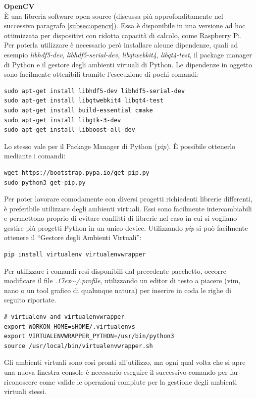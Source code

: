 \documentclass[12pt]{article}
\newcommand{\quotes}[1]{``#1''}
\begin{document}
\vspace{0.5cm}
\textbf{OpenCV}\\
È una libreria software open source (discussa più approfonditamente nel successivo paragrafo \ref{subsec:opencv}).
Essa è disponibile in una versione ad hoc ottimizzata per dispositivi con ridotta capacità di calcolo, come Raspberry Pi. Per poterla utilizzare è necessario però installare alcune dipendenze, quali ad esempio \textit{libhdf5-dev}, \textit{libhdf5-serial-dev}, \textit{libqtwebkit4}, \textit{libqt4-test}, il package manager di Python e il gestore degli ambienti virtuali di Python. Le dipendenze in oggetto sono facilmente ottenibili tramite l'esecuzione di pochi comandi:
\begin{lstlisting}
sudo apt-get install libhdf5-dev libhdf5-serial-dev
sudo apt-get install libqtwebkit4 libqt4-test
sudo apt-get install build-essential cmake
sudo apt-get install libgtk-3-dev
sudo apt-get install libboost-all-dev
\end{lstlisting}
Lo stesso vale per il Package Manager di Python (\textit{pip}). È possibile ottenerlo mediante i comandi:
\begin{lstlisting}
wget https://bootstrap.pypa.io/get-pip.py
sudo python3 get-pip.py
\end{lstlisting}
Per poter lavorare comodamente con diversi progetti richiedenti librerie differenti, è preferibile utilizzare degli ambienti virtuali. Essi sono facilmente intercambiabili e permettono proprio di evitare conflitti di librerie nel caso in cui si vogliano gestire più progetti Python in un unico device. Utilizzando \textit{pip} si può facilmente ottenere il \quotes{Gestore degli Ambienti Virtuali}:
\begin{lstlisting}
pip install virtualenv virtualenvwrapper
\end{lstlisting}
Per utilizzare i comandi resi disponibili dal precedente pacchetto, occorre modificare il file \textit{{\raise.17ex\hbox{$\scriptstyle\sim$}}/.profile}, utilizzando un editor di testo a piacere (vim, nano o un tool grafico di qualunque natura) per inserire in coda le righe di seguito riportate.
\begin{lstlisting}
# virtualenv and virtualenvwrapper
export WORKON_HOME=$HOME/.virtualenvs
export VIRTUALENVWRAPPER_PYTHON=/usr/bin/python3
source /usr/local/bin/virtualenvwrapper.sh
\end{lstlisting}
Gli ambienti virtuali sono così pronti all'utilizzo, ma ogni qual volta che si apre una nuova finestra console è necessario eseguire il successivo comando per far riconoscere come valide le operazioni compiute per la gestione degli ambienti virtuali stessi.
\end{document}

